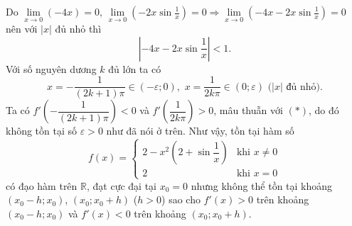 \begin{ex}
{		Do $\displaystyle \mathop {\lim }\limits_{x \to 0} ( - 4x) = 0,\,\mathop {\lim }\limits_{x \to 0} \left(  - 2x\sin \frac{1}{x} \right) = 0 \Rightarrow \mathop {\lim }\limits_{x \to 0} \left(  - 4x - 2x\sin \frac{1}{x} \right) = 0$ nên với $\left|x\right|$ đủ nhỏ thì 
		$$\left|{-4x-2x\sin \dfrac{1}{x}}\right|<1.$$
		Với số nguyên dương $k$ đủ lớn ta có 
		$$x=-\dfrac{1}{(2k+1)\pi }\in \left(-\varepsilon ;0\right), \,\,  x=\dfrac{1}{2k\pi }\in \left({0;\varepsilon }\right)\,\,\text{($\left|x\right|$ đủ nhỏ).}$$
		Ta có $f'\left(-\dfrac{1}{(2k+1)\pi }\right)<0$ và $f'\left(\dfrac{1}{2k\pi }\right)>0$, mâu thuẫn với $(*)$, do đó không tồn tại số $\varepsilon >0$ như đã nói ở trên. Như vậy, tồn tại hàm số 
		$$f(x) = \left\{ \begin{array}{ll}
		2 - {x^2}\left( 2 + \sin \dfrac{1}{x} \right)&\text{khi}\,\, x \ne 0\\
		2&\text{khi}\,\, x = 0
		\end{array} \right.$$
		có đạo hàm trên $\mathbb{R}$, đạt cực đại tại $x_0=0$ nhưng không thể tồn tại  khoảng $\left(x_0-h;x_0\right)$, $\left(x_0;x_0+h\right)$ ($h>0$) sao cho $f'(x)>0$ trên khoảng $\left(x_0-h;x_0\right)$ và $f'(x)<0$ trên khoảng $\left(x_0;x_0+h\right)$.}
\end{ex}

